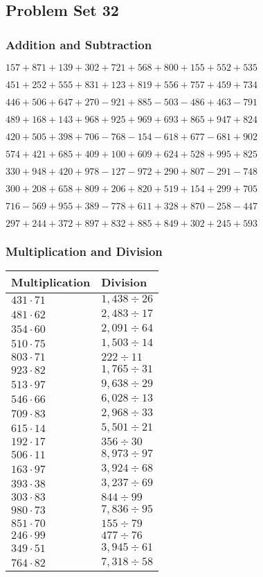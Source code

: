 \hypertarget{problem-set-32-2}{%
\subsection{Problem Set 32}\label{problem-set-32-2}}

\hypertarget{addition-and-subtraction-132}{%
\subsubsection{Addition and
Subtraction}\label{addition-and-subtraction-132}}

\(157 + 871 + 139 + 302 + 721 + 568 + 800 + 155 + 552 + 535\)

\(451 + 252 + 555 + 831 + 123 + 819 + 556 + 757 + 459 + 734\)

\(446 + 506 + 647 + 270 - 921 + 885 - 503 - 486 + 463 - 791\)

\(489 + 168 + 143 + 968 + 925 + 969 + 693 + 865 + 947 + 824\)

\(420 + 505 + 398 + 706 - 768 - 154 - 618 + 677 - 681 + 902\)

\(574 + 421 + 685 + 409 + 100 + 609 + 624 + 528 + 995 + 825\)

\(330 + 948 + 420 + 978 - 127 - 972 + 290 + 807 - 291 - 748\)

\(300 + 208 + 658 + 809 + 206 + 820 + 519 + 154 + 299 + 705\)

\(716 - 569 + 955 + 389 - 778 + 611 + 328 + 870 - 258 - 447\)

\(297 + 244 + 372 + 897 + 832 + 885 + 849 + 302 + 245 + 593\)

\hypertarget{multiplication-and-division-132}{%
\subsubsection{Multiplication and
Division}\label{multiplication-and-division-132}}

\begin{longtable}[]{@{}ll@{}}
\toprule
Multiplication & Division\tabularnewline
\midrule
\endhead
\(431 \cdot 71\) & \(1,438 ÷26\)\tabularnewline
\(481 \cdot 62\) & \(2,483÷17\)\tabularnewline
\(354 \cdot 60\) & \(2,091÷64\)\tabularnewline
\(510 \cdot 75\) & \(1,503÷14\)\tabularnewline
\(803 \cdot 71\) & \(222÷11\)\tabularnewline
\(923 \cdot 82\) & \(1,765÷31\)\tabularnewline
\(513 \cdot 97\) & \(9,638÷29\)\tabularnewline
\(546 \cdot 66\) & \(6,028÷13\)\tabularnewline
\(709 \cdot 83\) & \(2,968÷33\)\tabularnewline
\(615 \cdot 14\) & \(5,501÷21\)\tabularnewline
\(192 \cdot 17\) & \(356÷30\)\tabularnewline
\(506 \cdot 11\) & \(8,973÷97\)\tabularnewline
\(163 \cdot 97\) & \(3,924÷68\)\tabularnewline
\(393 \cdot 38\) & \(3,237÷69\)\tabularnewline
\(303 \cdot 83\) & \(844÷99\)\tabularnewline
\(980 \cdot 73\) & \(7,836÷95\)\tabularnewline
\(851 \cdot 70\) & \(155÷79\)\tabularnewline
\(246 \cdot 99\) & \(477÷76\)\tabularnewline
\(349 \cdot 51\) & \(3,945÷61\)\tabularnewline
\(764 \cdot 82\) & \(7,318÷58\)\tabularnewline
\bottomrule
\end{longtable}

